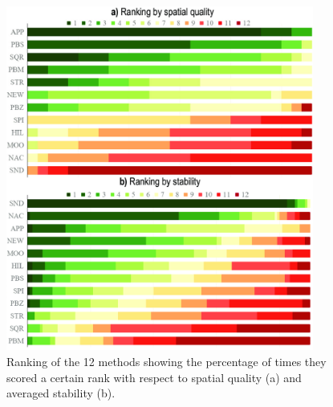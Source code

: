\begin{figure}[htbp!]
\centering
\includegraphics[width=0.9\textwidth]{figures/initial-treemap-evaluation/rank-vertical.png}
\vspace{-0.1cm}
\caption{Ranking of the 12 methods showing the percentage of times they scored a certain rank with respect to spatial quality (a) and averaged stability (b).}
\vspace{-0.2cm}
\label{fig:rankchart}
\end{figure}

